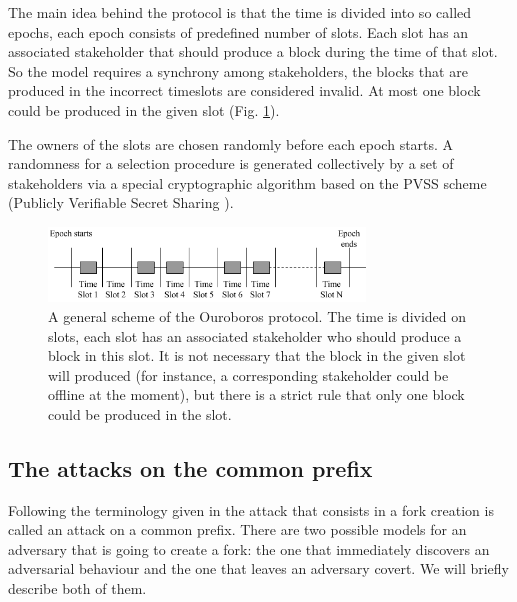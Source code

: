 \documentclass[10pt,a4paper]{article}
\numberwithin{equation}{section} %
\theoremstyle{plain}
\theoremstyle{definition}
\theoremstyle{remark}
\begin{document}
	The main idea behind the protocol is that the time is divided into so called epochs, each epoch consists of predefined number of slots. Each slot has an associated stakeholder that should produce a block during the time of that slot. So the model requires a synchrony among stakeholders, the blocks that are produced in the incorrect timeslots are considered invalid. At most one block could be produced in the given slot (Fig. \ref{fig:ouroboros_general}).
	
	The owners of the slots are chosen randomly before each epoch starts. A randomness for a selection procedure is generated collectively by a set of stakeholders via a special cryptographic algorithm based on the PVSS scheme (Publicly Verifiable Secret Sharing \cite{}).
	
	\begin{figure}[h] 
        \centering
        \includegraphics[width=0.75\textwidth]{Ouroboros_general}
        \caption{A general scheme of the Ouroboros protocol. The time is divided on slots, each slot has an associated stakeholder who should produce a block in this slot. It is not necessary that the block in the given slot will produced (for instance, a corresponding stakeholder could be offline at the moment), but there is a strict rule that only one block could be produced in the slot.}
        \label{fig:ouroboros_general}
    \end{figure}
    
    \subsection{The attacks on the common prefix}
    
    Following the terminology given in \cite{KRDO16} the attack that consists in a fork creation is called an attack on a common prefix. There are two possible models for an adversary that is going to create a fork: the one that immediately discovers an adversarial behaviour and the one that leaves an adversary covert. We will briefly describe both of them.
    
\end{document}
